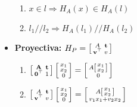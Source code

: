 \documentclass[12pt,a4paper]{article}
\begin{document}
\begin{itemize}
\begin{enumerate}
		\item $x \in l \Rightarrow H_{A}(x) \in H_{A}(l)$

		\item $l_{1} // l_{2} \Rightarrow H_{A}(l_{1})//H_{A}(l_{2})$
	\end{enumerate}

\item {\bf Proyectiva:}
$H_{P} =
\left[ {\begin{smallmatrix}
 A & {\bf t}\\
 {\bf v}^{\top} & v \\
\end{smallmatrix} } \right]
$

	\begin{enumerate}
		\item $\left[ {\begin{smallmatrix}
		 {\bf A} & {\bf t}\\
		 {\bf 0}^{\top} & 1 \\
		\end{smallmatrix} } \right] \left[ {\begin{smallmatrix}
		 x_{1}\\
		 x_{2}\\
		 0\\
		\end{smallmatrix} } \right] = \left[ {\begin{smallmatrix}
		 A\left[ {\begin{smallmatrix}
		  x_{1}\\
		   x_{2}\\
		 \end{smallmatrix} } \right]\\
		 0\\
		\end{smallmatrix} } \right]
		$

		\item $\left[ {\begin{smallmatrix}
		  A & {\bf t}\\
		 {\bf v}^{\top} & v \\
		\end{smallmatrix} } \right] \left[ {\begin{smallmatrix}
		 x_{1}\\
		 x_{2}\\
		 0\\
		\end{smallmatrix} } \right] = \left[ {\begin{smallmatrix}
		 A\left[ {\begin{smallmatrix}
		  x_{1}\\
		   x_{2}\\
		 \end{smallmatrix} } \right]\\
		 v_{1}x_{1}+v_{2}x_{2}\\
		\end{smallmatrix} } \right]
		$


\end{enumerate}
\end{itemize}
\end{document}
